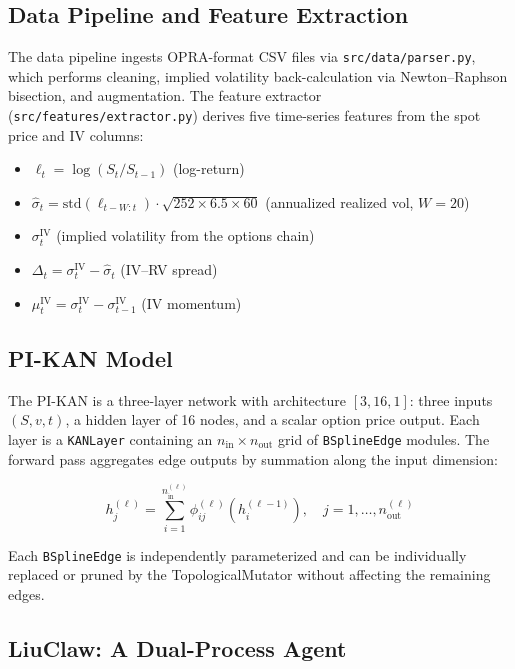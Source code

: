\documentclass[11pt,a4paper]{article}
\begin{document}
\subsection{Data Pipeline and Feature Extraction}

The data pipeline ingests OPRA-format CSV files via \texttt{src/data/parser.py}, which performs cleaning, implied volatility back-calculation via Newton--Raphson bisection, and augmentation. The feature extractor (\texttt{src/features/extractor.py}) derives five time-series features from the spot price and IV columns:
\begin{itemize}
  \item $\ell_t = \log(S_t / S_{t-1})$ (log-return)
  \item $\hat{\sigma}_t = \text{std}(\ell_{t-W:t}) \cdot \sqrt{252 \times 6.5 \times 60}$ (annualized realized vol, $W=20$)
  \item $\sigma^\text{IV}_t$ (implied volatility from the options chain)
  \item $\Delta_t = \sigma^\text{IV}_t - \hat{\sigma}_t$ (IV--RV spread)
  \item $\mu^\text{IV}_t = \sigma^\text{IV}_t - \sigma^\text{IV}_{t-1}$ (IV momentum)
\end{itemize}

\subsection{PI-KAN Model}

The PI-KAN is a three-layer network with architecture $[3, 16, 1]$: three inputs $(S, v, t)$, a hidden layer of 16 nodes, and a scalar option price output. Each layer is a \texttt{KANLayer} containing an $n_\text{in} \times n_\text{out}$ grid of \texttt{BSplineEdge} modules. The forward pass aggregates edge outputs by summation along the input dimension:

\begin{equation}
h_j^{(\ell)} = \sum_{i=1}^{n_\text{in}^{(\ell)}} \phi_{ij}^{(\ell)}\!\left(h_i^{(\ell-1)}\right), \quad j = 1, \ldots, n_\text{out}^{(\ell)}
\label{eq:kan_forward}
\end{equation}

Each \texttt{BSplineEdge} is independently parameterized and can be individually replaced or pruned by the TopologicalMutator without affecting the remaining edges.

\subsection{LiuClaw: A Dual-Process Agent}
\end{document}
